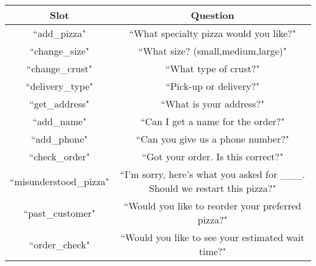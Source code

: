 \documentclass{article}
\begin{document}
\begin{tabular}{|c|c|}
\hline
Slot & Question \\\hline
``add\_pizza" & ``What specialty pizza would you like?"\\\hline
``change\_size" & ``What size? (small,medium,large)"\\\hline
``change\_crust" & ``What type of crust?"\\\hline
``delivery\_type" & ``Pick-up or delivery?"\\\hline
``get\_address" & ``What is your address?"\\\hline
``add\_name" & ``Can I get a name for the order?"\\\hline
``add\_phone" & ``Can you give us a phone number?"\\\hline
``check\_order" & ``Got your order. Is this correct?"\\\hline
``misunderstood\_pizza" & ``I'm sorry, here's what you asked for \_\_\_. Should we restart this pizza?"\\\hline
``past\_customer" & ``Would you like to reorder your preferred pizza?"\\\hline
``order\_check" & ``Would you like to see your estimated wait time?"\\\hline
\end{tabular}
\end{document}
